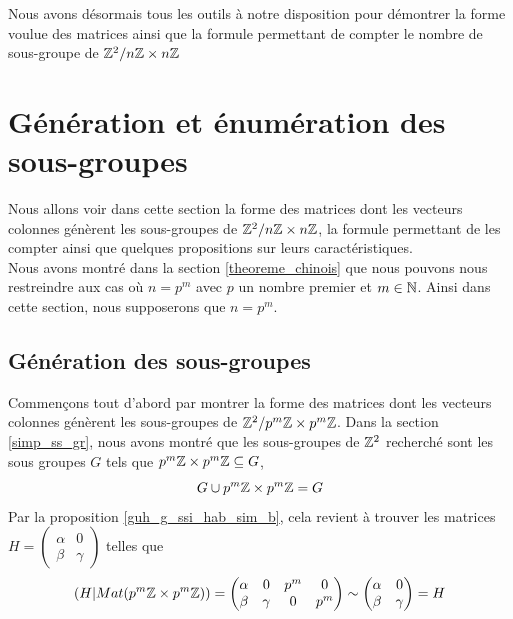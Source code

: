 \documentclass[12pt]{article}
\newcommand*{\pmZpmZ }{p^m\Z \x p^m\Z}
\newcommand*{\ZZpmZ}{\Z^2/\pmZpmZ}
\newcommand*{\ZZnZ}{\Z^2/\nZnZ}
\newcommand{\nZnZ}{n\Z \x n\Z}
\begin{document}
Nous avons désormais tous les outils à notre disposition pour
démontrer la forme voulue des matrices ainsi que la formule permettant de compter le nombre
de sous-groupe de $\ZZnZ$

\newpage
\section {Génération et énumération des sous-groupes}
Nous allons voir dans cette section la forme des matrices dont les vecteurs colonnes génèrent
les sous-groupes de $\ZZnZ$, la formule permettant de les compter ainsi que quelques propositions
sur leurs caractéristiques.\\
Nous avons montré dans la section \ref{theoreme_chinois} que nous
pouvons nous restreindre aux cas où $n = p^m$ avec $p$ un nombre premier et $m \in \mathbb N$.
Ainsi dans cette section, nous supposerons que $n = p^m$.

\subsection{Génération des sous-groupes}
Commençons tout d'abord par montrer la forme des matrices dont les vecteurs colonnes génèrent
les sous-groupes de $\ZZpmZ$. Dans la section \ref{simp_ss_gr}, nous avons montré que les
sous-groupes de $\mathbb Z^2$ recherché sont les sous groupes $G$ tels que
$\pmZpmZ \subseteq G$, \cad
$$ G \cup \pmZpmZ = G$$
Par la proposition \ref{guh_g_ssi_hab_sim_b}, cela revient à trouver les
matrices $H = \begin{pmatrix}
		\alpha & 0      \\
		\beta  & \gamma
	\end{pmatrix}$
telles que $$(H | Mat(\pmZpmZ)) =
	\begin{pmatrix}
		\alpha & 0      & p^m & 0   \\
		\beta  & \gamma & 0   & p^m
	\end{pmatrix}
	\sim	\begin{pmatrix}
		\alpha & 0      \\
		\beta  & \gamma
	\end{pmatrix}
	= H
$$
\end{document}
